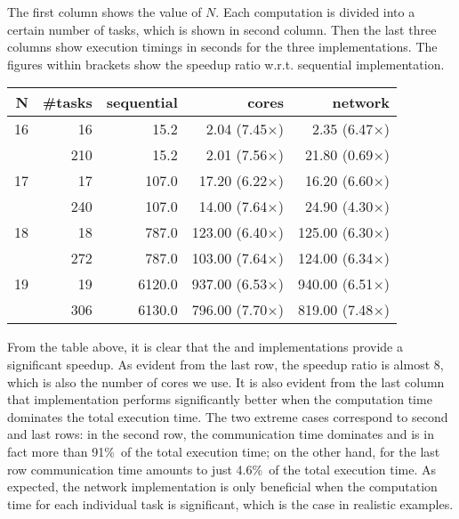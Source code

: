 \documentclass[preprint]{sigplanconf}
\begin{document}
The first column shows the value of $N$.
Each computation is divided into a certain number of tasks,
which is shown in second column.
Then the last three columns show execution timings in seconds for the
three implementations. The figures within brackets show the speedup
ratio w.r.t. sequential implementation.
\begin{center}
  \begin{tabular}{|r|r|r|r|r|}
    \hline
    N & \#tasks  & sequential& cores                 & network 
    \\\hline\hline
    16 &   16    &  15.2     &   2.04 (7.45$\times$) &  2.35  (6.47$\times$) 
    \\\hline
       &  210    &  15.2     &   2.01 (7.56$\times$) & 21.80  (0.69$\times$)
    \\\hline
    17 &   17    & 107.0     &  17.20 (6.22$\times$) & 16.20  (6.60$\times$)
    \\\hline
       &  240    & 107.0     &  14.00 (7.64$\times$) & 24.90  (4.30$\times$)
    \\\hline
    18 &   18    & 787.0     & 123.00 (6.40$\times$) & 125.00 (6.30$\times$)  
    \\\hline
       &  272    & 787.0     & 103.00 (7.64$\times$) & 124.00 (6.34$\times$)  
    \\\hline
    19 &   19    &6120.0     & 937.00 (6.53$\times$) & 940.00 (6.51$\times$)  
    \\\hline
       &  306    &6130.0     & 796.00 (7.70$\times$) & 819.00 (7.48$\times$)
    \\\hline
  \end{tabular}
\end{center}
From the table above, it is clear that the  and 
implementations provide a significant speedup. As evident from the
last row, the speedup ratio is almost 8, which is also the number of
cores we use.  It is also evident from the last column that
 implementation performs significantly better when the
computation time dominates the total execution time.  The two extreme
cases correspond to second and last rows: in the second row, the
communication time dominates and is in fact more than 91\%\ of the
total execution time; on the other hand, for the last row
communication time amounts to just 4.6\%\ of the total execution time.
As expected, the network implementation is only beneficial when the
computation time for each individual task is significant, which is the
case in realistic examples.
\end{document}
